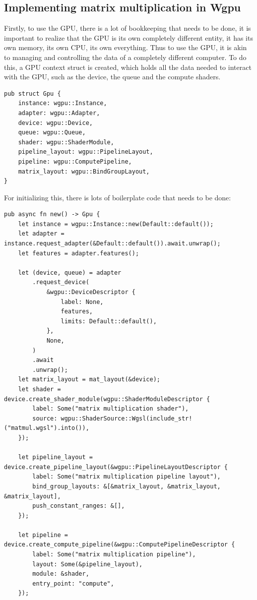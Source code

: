 \documentclass{article}
\begin{document}
\begin{appendices}

\appendix

\section{Implementing matrix multiplication in Wgpu}

\label{sec:wgpu}

Firstly, to use the GPU, there is a lot of bookkeeping that needs to be done,
it is important to realize that the GPU is its own completely different entity,
it has its own memory, its own CPU, its own everything.
Thus to use the GPU, it is akin to managing and controlling the data
of a completely different computer.
To do this, a GPU context struct is created, which holds all the data needed to interact with the GPU,
such as the device, the queue and the compute shaders.

\begin{verbatim}
pub struct Gpu {
	instance: wgpu::Instance,
	adapter: wgpu::Adapter,
	device: wgpu::Device,
	queue: wgpu::Queue,
	shader: wgpu::ShaderModule,
	pipeline_layout: wgpu::PipelineLayout,
	pipeline: wgpu::ComputePipeline,
	matrix_layout: wgpu::BindGroupLayout,
}
\end{verbatim}

For initializing this, there is lots of boilerplate code that needs to be done:

\begin{verbatim}
pub async fn new() -> Gpu {
	let instance = wgpu::Instance::new(Default::default());
	let adapter = instance.request_adapter(&Default::default()).await.unwrap();
	let features = adapter.features();

	let (device, queue) = adapter
		.request_device(
			&wgpu::DeviceDescriptor {
				label: None,
				features,
				limits: Default::default(),
			},
			None,
		)
		.await
		.unwrap();
	let matrix_layout = mat_layout(&device);
	let shader = device.create_shader_module(wgpu::ShaderModuleDescriptor {
		label: Some("matrix multiplication shader"),
		source: wgpu::ShaderSource::Wgsl(include_str!("matmul.wgsl").into()),
	});

	let pipeline_layout = device.create_pipeline_layout(&wgpu::PipelineLayoutDescriptor {
		label: Some("matrix multiplication pipeline layout"),
		bind_group_layouts: &[&matrix_layout, &matrix_layout, &matrix_layout],
		push_constant_ranges: &[],
	});

	let pipeline = device.create_compute_pipeline(&wgpu::ComputePipelineDescriptor {
		label: Some("matrix multiplication pipeline"),
		layout: Some(&pipeline_layout),
		module: &shader,
		entry_point: "compute",
	});


\end{verbatim}
\end{appendices}
\end{document}
